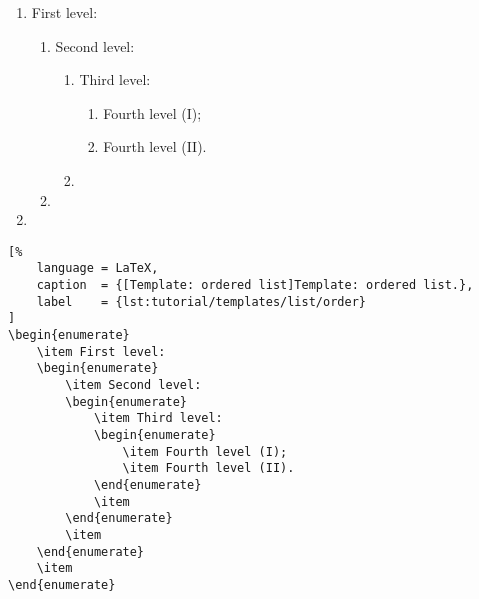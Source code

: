 \begin{enumerate}
    \item First level: 
    \begin{enumerate}
        \item Second level: 
        \begin{enumerate}
            \item Third level: 
            \begin{enumerate}
                \item Fourth level (I);
                \item Fourth level (II).
            \end{enumerate}
            \item
        \end{enumerate}
        \item
    \end{enumerate}
    \item
\end{enumerate}

\begin{lstlisting}[%
    language = LaTeX,
    caption  = {[Template: ordered list]Template: ordered list.},
    label    = {lst:tutorial/templates/list/order}
]
\begin{enumerate}
    \item First level: 
    \begin{enumerate}
        \item Second level: 
        \begin{enumerate}
            \item Third level: 
            \begin{enumerate}
                \item Fourth level (I);
                \item Fourth level (II).
            \end{enumerate}
            \item
        \end{enumerate}
        \item
    \end{enumerate}
    \item
\end{enumerate}
\end{lstlisting}